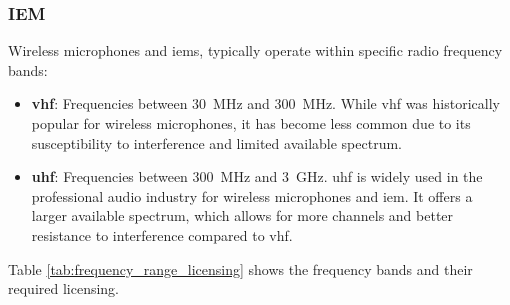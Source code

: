         \subsubsection{IEM}
            Wireless microphones and \gls{iem}s, typically operate within specific radio frequency bands:

            \begin{itemize}
                \item \textbf{\gls{vhf}}: Frequencies between \SI{30}{\MHz} and \SI{300}{\MHz}. While \gls{vhf} was historically popular for wireless microphones, it has become less common due to its susceptibility to interference and limited available spectrum.
                \item \textbf{\gls{uhf}}: Frequencies between \SI{300}{\MHz} and \SI{3}{\GHz}. \gls{uhf} is widely used in the professional audio industry for wireless microphones and \gls{iem}. It offers a larger available spectrum, which allows for more channels and better resistance to interference compared to \gls{vhf}.
            \end{itemize}

            \citep{shure2024}

            Table \ref{tab:frequency_range_licensing} shows the frequency bands and their required licensing.

